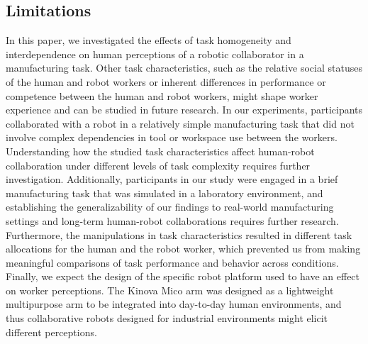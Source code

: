 \subsection{Limitations}
In this paper, we investigated the effects of task homogeneity and interdependence on human perceptions of a robotic collaborator in a manufacturing task. Other task characteristics, such as the relative social statuses of the human and robot workers or inherent differences in performance or competence between the human and robot workers, might shape worker experience and can be studied in future research. In our experiments, participants collaborated with a robot in a relatively simple manufacturing task that did not involve complex dependencies in tool or workspace use between the workers. Understanding how the studied task characteristics affect human-robot collaboration under different levels of task complexity requires further investigation. Additionally, participants in our study were engaged in a brief manufacturing task that was simulated in a laboratory environment, and establishing the generalizability of our findings to real-world manufacturing settings and long-term human-robot collaborations requires further research. Furthermore, the manipulations in task characteristics resulted in different task allocations for the human and the robot worker, which prevented us from making meaningful comparisons of task performance and behavior across conditions. Finally, we expect the design of the specific robot platform used to have an effect on worker perceptions. The Kinova Mico arm was designed as a lightweight multipurpose arm to be integrated into day-to-day human environments, and thus collaborative robots designed for industrial environments might elicit different perceptions.
